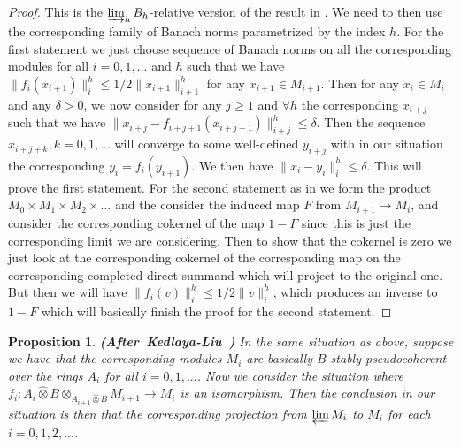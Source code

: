 \documentclass[12pt]{amsart}
\newtheorem{proposition}[theorem]{Proposition}
\theoremstyle{definition}
\numberwithin{equation}{section}
\begin{document}
\begin{proof}
This is the $\varinjlim_h B_h$-relative version of the result in \cite[Lemma 2.6.3]{KL2}. We need to then use the corresponding family of Banach norms parametrized by the index $h$. For the first statement we just choose sequence of Banach norms on all the corresponding modules for all $i=0,1,...$ and $h$ such that we have $\|f_i(x_{i+1})\|^h_i\leq 1/2\|x_{i+1}\|^h_{i+1}$ for any $x_{i+1}\in M_{i+1}$. Then for any $x_i\in M_i$ and any $\delta>0$, we now consider for any $j\geq 1$ and $\forall h$ the corresponding $x_{i+j}$ such that we have $\|x_{i+j}-f_{i+j+1}(x_{i+j+1})\|^h_{i+j}\leq \delta$. Then the sequence $x_{i+j+k},k=0,1,...$ will converge to some well-defined $y_{i+j}$ with in our situation the corresponding $y_{i}=f_{i}(y_{i+1})$. We then have $\|x_i-y_i\|^h_i\leq \delta$. This will prove the first statement. For the second statement as in \cite[Lemma 2.6.3]{KL2} we form the product $M_0\times M_1\times M_2\times...$ and the consider the induced map $F$ from $M_{i+1}\rightarrow M_i$, and consider the corresponding cokernel of the map $1-F$ since this is just the corresponding limit we are considering. Then to show that the cokernel is zero we just look at the corresponding cokernel of the corresponding map on the corresponding completed direct summand which will project to the original one. But then we will have $\|f_i(v)\|^h_i\leq 1/2 \|v\|^h_i$, which produces an inverse to $1-F$ which will basically finish the proof for the second statement. 	
\end{proof}


\begin{proposition} \mbox{\bf{(After Kedlaya-Liu \cite[Lemma 2.6.4]{KL2})}} In the same situation as above, suppose we have that the corresponding modules $M_i$ are basically $B$-stably pseudocoherent over the rings $A_i$ for all $i=0,1,...$. Now we consider the situation where $f_i:A_i\widehat{\otimes}B\otimes_{A_{i+1}\widehat{\otimes}B}M_{i+1}\rightarrow M_i$ is an isomorphism. Then the conclusion in our situation is then that the corresponding projection from $\varprojlim M_i$ to $M_i$ for each $i=0,1,2,...$. 

	
\end{proposition}
\end{document}
